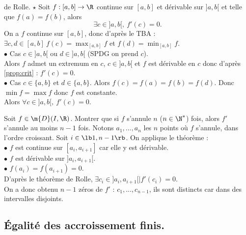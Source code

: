 \documentclass[11pt]{article}
\begin{document}
\begin{thm}{de Rolle. $\star$}{}
    Soit $f:[a,b]\to\R$ continue sur $[a,b]$ et dérivable sur $]a,b[$ et telle que $f(a)=f(b)$, alors
    \begin{equation*}
        \exists c \in ]a,b[, ~ f'(c)=0.
    \end{equation*}
    \tcblower
    On a $f$ continue sur $[a,b]$, donc d'après le TBA : $\exists c,d \in[a,b] ~ f(c)=\max_{[a,b]} f$ et $f(d)=\min_{[a,b]} f$.\\
    $\bullet$ Cas $c\in]a,b[$ ou $d\in]a,b[$ (SPDG on prend $c$).\\
    Alors $f$ admet un extremum en $c$, $c\in]a,b[$ et $f$ est dérivable en $c$ donc d'après \ref{prop:crit} : $f'(c)=0$.\\
    $\bullet$ Cas $c\in\{a,b\}$ et $d\in\{a,b\}$. Alors $f(c)=f(a)=f(b)=f(d)$. Donc $\min f = \max f$ donc $f$ est constante.\\
    Alors $\forall c \in ]a,b[, ~ f'(c)=0$.
\end{thm}

\vspace*{0.4cm}

\begin{ex}{}{}
    Soit $f\in\m{D}(I,\R)$. Montrer que si $f$ s'annule $n$ ($n\in\N^*$) fois, alors $f'$ s'annule au moins $n-1$ fois.
    \tcblower
    Notons $a_1,...,a_n$ les $n$ points où $f$ s'annule, dans l'ordre croissant. Soit $i\in\lb1,n-1\rb$. On applique le théorème :\\
    $\bullet$ $f$ est continue sur $[a_i,a_{i+1}]$ car elle y est dérivable.\\
    $\bullet$ $f$ est dérivable sur $]a_i,a_{i+1}[$.\\
    $\bullet$ $f(a_i)=f(a_{i+1})=0$.\\
    D'après le théorème de Rolle, $\exists c_i \in ]a_i,a_{i+1}[ \mid f'(c_i)=0.$\\
    On a donc obtenu $n-1$ zéros de $f'$ : $c_1,...,c_{n-1}$, ils sont distincts car dans des intervalles disjoints.
\end{ex}

\subsection{Égalité des accroissement finis.}

\vspace*{0.4cm}
\end{document}
